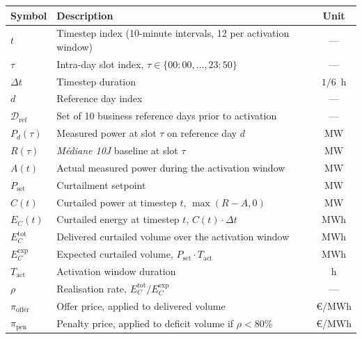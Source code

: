 \documentclass{article}
\begin{document}
\begin{tabular}{@{}llc@{}}
\toprule
Symbol & Description & Unit \\ \midrule
$t$                     & Timestep index (10-minute intervals, 12 per activation window) & ---       \\
$\tau$                  & Intra-day slot index, $\tau \in \{00{:}00, \dots, 23{:}50\}$   & ---       \\
$\Delta t$              & Timestep duration                                               & $1/6$~h  \\
$d$                     & Reference day index                                             & ---       \\
$\mathcal{D}_{\text{ref}}$ & Set of 10 business reference days prior to activation        & ---       \\
$P_d(\tau)$             & Measured power at slot $\tau$ on reference day $d$              & MW        \\
$R(\tau)$               & \textit{M\'ediane 10J} baseline at slot $\tau$                   & MW       \\
$A(t)$                  & Actual measured power during the activation window              & MW        \\
$P_{\text{set}}$        & Curtailment setpoint                                            & MW        \\
$C(t)$                  & Curtailed power at timestep $t$, $\max(R-A, 0)$                 & MW        \\
$E_C(t)$                & Curtailed energy at timestep $t$, $C(t) \cdot \Delta t$         & MWh       \\
$E_C^{\text{tot}}$      & Delivered curtailed volume over the activation window           & MWh       \\
$E_C^{\text{exp}}$      & Expected curtailed volume, $P_{\text{set}} \cdot T_{\text{act}}$ & MWh     \\
$T_{\text{act}}$        & Activation window duration                                      & h         \\
$\rho$                  & Realisation rate, $E_C^{\text{tot}} / E_C^{\text{exp}}$         & ---       \\
$\pi_{\text{offer}}$    & Offer price, applied to delivered volume                        & \euro/MWh \\
$\pi_{\text{pen}}$      & Penalty price, applied to deficit volume if $\rho < 80\%$       & \euro/MWh \\ \bottomrule
\end{tabular}
\end{document}

